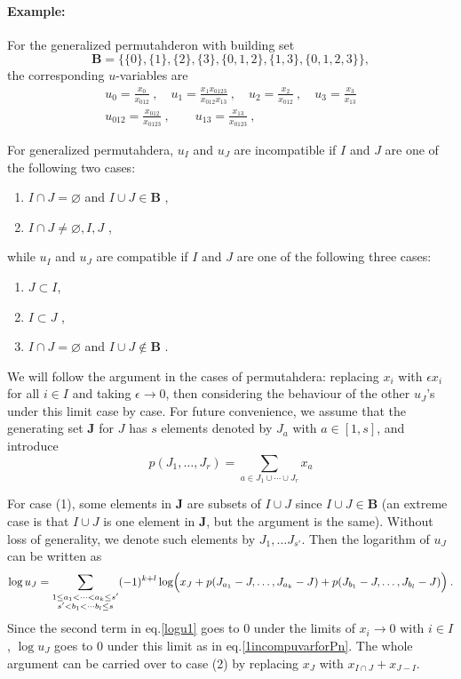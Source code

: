 \documentclass[hidelinks,12pt]{article}
\begin{document}
\begin{enumerate}
\paragraph{Example:} For the generalized permutahderon with building set 
\[
\mathbf{B}=\{\{0\},\{1\},\{2\},\{3\},\{0,1,2\},\{1,3\},\{0,1,2,3\}\},
\]
the corresponding $u$-variables are
\begin{gather*}
   u_{0}=\frac{x_{0}}{x_{012}} \:,\quad  u_{1}=\frac{x_{1}x_{0123}}{x_{012}x_{13}} \:,\quad 
   u_{2}=\frac{x_{2}}{x_{012}} \:, \quad u_{3}=\frac{x_{3}}{x_{13}} \\
   u_{012}=\frac{x_{012}}{x_{0123}}\:,\qquad u_{13}=\frac{x_{13}}{x_{0123}} \:, \quad 
\end{gather*}

For generalized permutahdera, $u_{I}$ and $u_{J}$ are incompatible if $I$ and $J$ are one of the following two cases:
\begin{enumerate}
   \item $I\cap J=\varnothing$ and $I\cup J \in \mathbf{B}$ \:, 
   \item $I\cap J \neq \varnothing,I, J $ \:,
\end{enumerate}
while $u_{I}$ and $u_{J}$ are compatible if $I$ and $J$ are one of the following three cases:
\begin{enumerate}[resume]
   \item $J\subset I$\:,
   \item $I\subset J$ \:,
   \item $I\cap J=\varnothing$ and $I\cup J \notin \mathbf{B}$ \:.
\end{enumerate}
We will follow the argument in the cases of permutahdera: replacing $x_{i}$ with $ \epsilon x_{i}$ for all $i\in I$ and taking $\epsilon \to 0$, then considering the behaviour of the other $u_{J}$'s under this limit case by case. For future convenience, we assume that the generating set $\mathbf{J}$ for $J$ has $s$ elements denoted by $J_{a}$ with $a\in[1,s]$, and introduce 
\begin{equation}
   p(J_{1},\ldots,J_{r}) = \sum_{a\in J_{1}\cup\cdots\cup J_{r}}x_{a}
\end{equation}

For case (1), some elements in $\mathbf{J}$ are subsets of $I\cup J$ since $I\cup J \in \mathbf{B}$ (an extreme case is that  $I\cup J$ is one element in $\mathbf{J}$, but the argument is the same). Without loss of generality, we denote such elements by $J_{1},\ldots J_{s'}$. Then the logarithm of $u_{J}$ can be written as 
\begin{equation}
   \log u_{J}= \sum_{\substack {1 \leq a_{1}<\cdots<a_{k}\leq s'\\ s'<b_{1}<\cdots b_{l}\leq s}}(-1)^{k+l}\log\Bigl( x_{J}+ p(J_{a_{1}}-J,\ldots,J_{a_{k}}-J) + p(J_{b_{1}}-J,\ldots, J_{b_{l}}-J)\Bigr) \:. \label{logu1}
\end{equation}
Since the second term in eq.\eqref{logu1} goes to 0 under the limits of $x_{i}\to 0$ with $i\in I$, $\log u_{J}$ goes to 0 under this limit as in eq.\eqref{1incompuvarforPn}. The whole argument can be carried over to case (2) by replacing $x_{J}$ with $x_{I\cap J}+ x_{J-I}$.


\end{enumerate}
\end{document}
